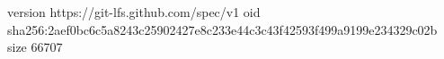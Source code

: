 version https://git-lfs.github.com/spec/v1
oid sha256:2aef0bc6c5a8243c25902427e8c233e44c3c43f42593f499a9199e234329c02b
size 66707
